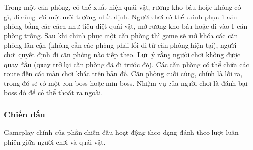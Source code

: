 \hspace*{1cm}Trong một căn phòng, có thể xuất hiện quái vật, rương kho báu hoặc không có gì, đi cùng với một môi trường nhất định. Người chơi có thể chinh phục 1 căn phòng bằng các cách như tiêu diệt quái vật, mở rương kho báu hoặc đi vào 1 căn phòng trống. Sau khi chinh phục một căn phòng thì game sẽ mở khóa các căn phòng lân cận (không cần các phòng phải lối đi từ căn phòng hiện tại), người chơi quyết định đi căn phòng nào tiếp theo. Lưu ý rằng người chơi không được quay đầu (quay trở lại căn phòng đã đi trước đó). Các căn phòng có thể chứa các route đến các màn chơi khác trên bản đồ. Căn phòng cuối cùng, chính là lối ra, trong đó sẽ có một con boss hoặc min boss. Nhiệm vụ của người chơi là đánh bại boss đó để có thể thoát ra ngoài.\\
\subsubsection{Chiến đấu}
\hspace*{1cm}Gameplay chính của phần chiến đấu hoạt động theo dạng đánh theo lượt luân phiên giữa người chơi và quái vật.


